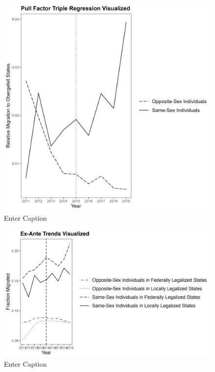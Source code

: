 \documentclass[]{article}
\begin{document}
\begin{figure}
    \centering
    \includegraphics[width=1\linewidth]{outputs/summary_stats/post_diffs.png}
    \caption{Enter Caption}
    \label{fig:enter-label}
\end{figure}

\begin{figure}
    \centering
    \includegraphics[width=1\linewidth]{outputs/summary_stats/ante_trends.png}
    \caption{Enter Caption}
    \label{fig:enter-label}
\end{figure}
\end{document}
